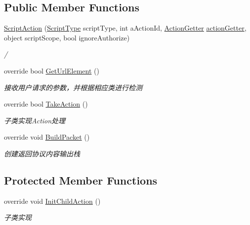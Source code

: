 \subsection*{Public Member Functions}
\begin{DoxyCompactItemize}
\item 
\mbox{\hyperlink{class_t_net_1_1_contract_1_1_action_1_1_script_action_afa4475e55dc455325de49e46d300880c}{Script\+Action}} (\mbox{\hyperlink{namespace_t_net_1_1_contract_1_1_action_a490a546f8f01a9b9305b8a0f8b98eded}{Script\+Type}} script\+Type, int a\+Action\+Id, \mbox{\hyperlink{class_t_net_1_1_service_1_1_action_getter}{Action\+Getter}} \mbox{\hyperlink{class_t_net_1_1_service_1_1_game_struct_a14dcf224eb5a73e2c0b3bee4fe359dd8}{action\+Getter}}, object script\+Scope, bool ignore\+Authorize)
\begin{DoxyCompactList}\small\item\em / \end{DoxyCompactList}\item 
override bool \mbox{\hyperlink{class_t_net_1_1_contract_1_1_action_1_1_script_action_a62f8da5926744674d545c2cb75d34ba7}{Get\+Url\+Element}} ()
\begin{DoxyCompactList}\small\item\em 接收用户请求的参数，并根据相应类进行检测 \end{DoxyCompactList}\item 
override bool \mbox{\hyperlink{class_t_net_1_1_contract_1_1_action_1_1_script_action_a93573bb7b31b15eccb5268ac64e2c41b}{Take\+Action}} ()
\begin{DoxyCompactList}\small\item\em 子类实现\+Action处理 \end{DoxyCompactList}\item 
override void \mbox{\hyperlink{class_t_net_1_1_contract_1_1_action_1_1_script_action_a23cfcb658cff38a503301f66ca5e97b1}{Build\+Packet}} ()
\begin{DoxyCompactList}\small\item\em 创建返回协议内容输出栈 \end{DoxyCompactList}\end{DoxyCompactItemize}
\subsection*{Protected Member Functions}
\begin{DoxyCompactItemize}
\item 
override void \mbox{\hyperlink{class_t_net_1_1_contract_1_1_action_1_1_script_action_a0e10cb82f7a96457248b836bcec83aa7}{Init\+Child\+Action}} ()
\begin{DoxyCompactList}\small\item\em 子类实现 \end{DoxyCompactList}\end{DoxyCompactItemize}
